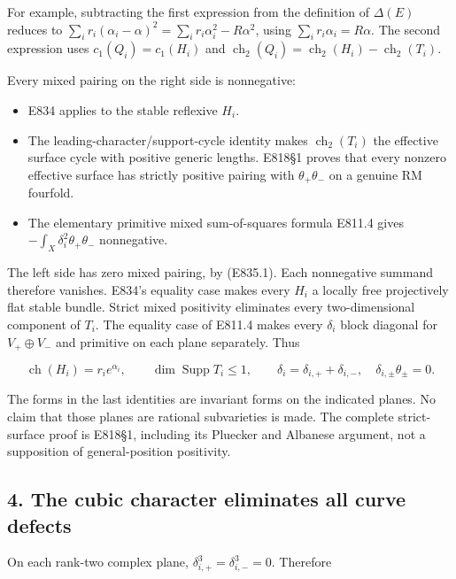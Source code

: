 For example, subtracting the first expression from the definition of
\(\Delta(E)\) reduces to \(\sum_i r_i(\alpha_i-\alpha)^2=\sum_i r_i\alpha_i^2-R\alpha^2\), using \(\sum_i r_i\alpha_i=R\alpha\). The second expression uses
\(c_1(Q_i)=c_1(H_i)\) and \(\operatorname{ch}_2(Q_i)=\operatorname{ch}_2(H_i)-\operatorname{ch}_2(T_i)\).

Every mixed pairing on the right side is nonnegative:

\begin{itemize}
\item
  E834 applies to the stable reflexive \(H_i\).
\item
  The leading-character/support-cycle identity makes \(\operatorname{ch}_2(T_i)\) the
  effective surface cycle with positive generic lengths. E818\S1 proves
  that every nonzero effective surface has strictly positive pairing
  with \(\theta_+\theta_-\) on a genuine RM fourfold.
\item
  The elementary primitive mixed sum-of-squares formula E811.4 gives
  \(-\int_X\delta_i^2\theta_+\theta_-\) nonnegative.
\end{itemize}

The left side has zero mixed pairing, by (E835.1). Each nonnegative
summand therefore vanishes. E834's equality case makes every \(H_i\) a
locally free projectively flat stable bundle. Strict mixed positivity
eliminates every two-dimensional component of \(T_i\). The equality case of
E811.4 makes every \(\delta_i\) block diagonal for \(V_+\oplus V_-\) and
primitive on each plane separately. Thus

\[
 \operatorname{ch}(H_i)=r_i e^{\alpha_i},\qquad
 \dim\operatorname{Supp}T_i\le1,
 \qquad \delta_i=\delta_{i,+}+\delta_{i,-},\quad
 \delta_{i,\pm}\theta_\pm=0.
 \tag{E835.5}
\]

The forms in the last identities are invariant forms on the indicated
planes. No claim that those planes are rational subvarieties is made.
The complete strict-surface proof is E818\S1, including its Pluecker and
Albanese argument, not a supposition of general-position positivity.

\subsection{4. The cubic character eliminates all curve
defects}\label{SF-E835:the-cubic-character-eliminates-all-curve-defects}

On each rank-two complex plane, \(\delta_{i,+}^3=\delta_{i,-}^3=0\).
Therefore

